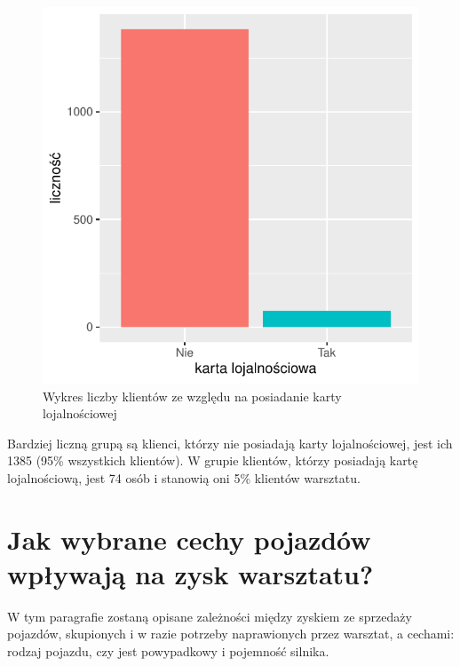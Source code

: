 \documentclass{article}\usepackage[]{graphicx}\usepackage[]{xcolor}
\makeatletter
\def\maxwidth{ %
  \ifdim\Gin@nat@width>\linewidth
    \linewidth
  \else
    \Gin@nat@width
  \fi
}
\newenvironment{knitrout}{}{} %
\makeatother
\begin{document}
\begin{knitrout}
\color{fgcolor}\begin{figure}[H]

{\centering \includegraphics[width=\maxwidth]{figure/fig_karta-1} 

}

\caption[Wykres liczby klientów ze względu na posiadanie karty lojalnościowej]{Wykres liczby klientów ze względu na posiadanie karty lojalnościowej}\label{fig:fig_karta}
\end{figure}

\end{knitrout}

Bardziej liczną grupą są klienci, którzy nie posiadają karty lojalnościowej, jest ich 1385 (95\% wszystkich klientów). W grupie klientów, którzy posiadają kartę lojalnościową, jest 74 osób i stanowią oni 5\% klientów warsztatu.

\section{Jak wybrane cechy pojazdów wpływają na zysk warsztatu?}

W tym paragrafie zostaną opisane zależności między zyskiem ze sprzedaży pojazdów, skupionych i w razie potrzeby naprawionych przez warsztat, a cechami: rodzaj pojazdu, czy jest powypadkowy i pojemność silnika.
\end{document}
